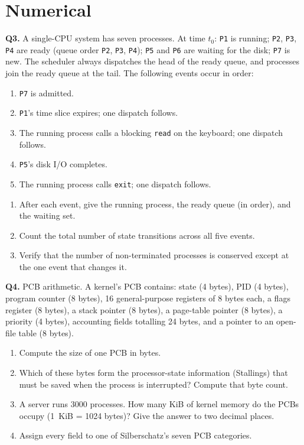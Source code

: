 \documentclass[11pt]{article}
\begin{document}
\section{Numerical}

\textbf{Q3.} A single-CPU system has seven processes. At time $t_0$: \texttt{P1} is running; \texttt{P2}, \texttt{P3}, \texttt{P4} are ready (queue order \texttt{P2}, \texttt{P3}, \texttt{P4}); \texttt{P5} and \texttt{P6} are waiting for the disk; \texttt{P7} is new. The scheduler always dispatches the head of the ready queue, and processes join the ready queue at the tail. The following events occur in order:
\begin{enumerate}
  \item[(i)] \texttt{P7} is admitted.
  \item[(ii)] \texttt{P1}'s time slice expires; one dispatch follows.
  \item[(iii)] The running process calls a blocking \texttt{read} on the keyboard; one dispatch follows.
  \item[(iv)] \texttt{P5}'s disk I/O completes.
  \item[(v)] The running process calls \texttt{exit}; one dispatch follows.
\end{enumerate}
\begin{enumerate}
  \item[(a)] After each event, give the running process, the ready queue (in order), and the waiting set.
  \item[(b)] Count the total number of state transitions across all five events.
  \item[(c)] Verify that the number of non-terminated processes is conserved except at the one event that changes it.
\end{enumerate}

\textbf{Q4.} PCB arithmetic. A kernel's PCB contains: state (4 bytes), PID (4 bytes), program counter (8 bytes), 16 general-purpose registers of 8 bytes each, a flags register (8 bytes), a stack pointer (8 bytes), a page-table pointer (8 bytes), a priority (4 bytes), accounting fields totalling 24 bytes, and a pointer to an open-file table (8 bytes).
\begin{enumerate}
  \item[(a)] Compute the size of one PCB in bytes.
  \item[(b)] Which of these bytes form the processor-state information (Stallings) that must be saved when the process is interrupted? Compute that byte count.
  \item[(c)] A server runs 3000 processes. How many KiB of kernel memory do the PCBs occupy (1~KiB = 1024 bytes)? Give the answer to two decimal places.
  \item[(d)] Assign every field to one of Silberschatz's seven PCB categories.
\end{enumerate}
\end{document}
